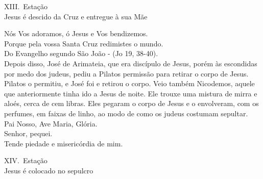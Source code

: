 \documentclass{book}
\begin{document}
\begin{center}
    XIII.\ Estação \\ Jesus é descido da Cruz e entregue à sua Mãe
\end{center}
\begin{flushleft}
    \VbarRed{} Nós Vos adoramos, ó Jesus e Vos bendizemos. \\
    \RbarRed{} Porque pela vossa Santa Cruz redimistes o mundo.
    \vspace{.2cm} \\
    Do Evangelho segundo São João - (\textcolor{VioletRed2}{Jo 19, 38-40}).
    \vspace{.2cm} \\
    Depois disso, José de Arimateia, que era discípulo de Jesus, porém às escondidas por medo dos judeus, pediu a Pilatos permissão para retirar o corpo de Jesus. Pilatos o permitiu, e José foi e retirou o corpo. Veio também Nicodemos, aquele que anteriormente tinha ido a Jesus de noite. Ele trouxe uma mistura de mirra e aloés, cerca de cem libras. Eles pegaram o corpo de Jesus e o envolveram, com os perfumes, em faixas de linho, ao modo de como os judeus costumam sepultar.
    \vspace{.2cm} \\
    Pai Nosso, Ave Maria, Glória.
    \vspace{.2cm} \\
    \VbarRed{} Senhor, pequei. \\
    \RbarRed{} Tende piedade e misericórdia de mim.
\end{flushleft}
\newpage
\begin{center}
    XIV.\ Estação \\ Jesus é colocado no sepulcro
\end{center}
\end{document}
